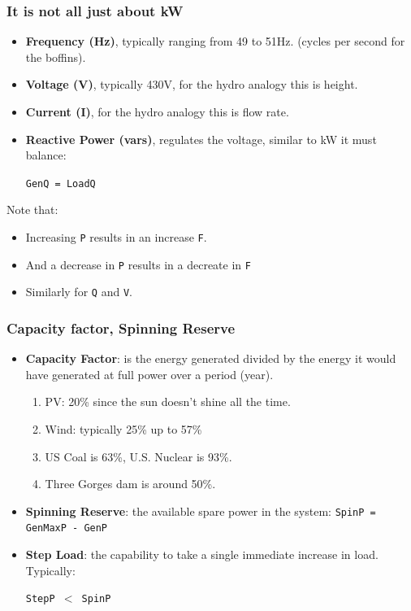 \documentclass{beamer}
\begin{document}
\begin{frame}\frametitle{It is not all just about kW}
  \begin{itemize}
  \item \textbf{Frequency (Hz)}, typically ranging from 49 to 51Hz.
    (cycles per second for the boffins).
  \item \textbf{Voltage (V)}, typically 430V, for the hydro analogy
    this is height.
  \item \textbf{Current (I)}, for the hydro analogy this is flow rate.
    \pause
  \item \textbf{Reactive Power (vars)}, regulates the voltage, similar
    to kW it must balance:
    
    \texttt{GenQ = LoadQ}
  \end{itemize}
  Note that:
  \begin{itemize}
  \item Increasing \texttt{P} results in an increase \texttt{F}.
  \item And a decrease in \texttt{P} results in a decreate in
    \texttt{F}
  \item Similarly for \texttt{Q} and \texttt{V}.
  \end{itemize}
\end{frame}

\begin{frame}\frametitle{Capacity factor, Spinning Reserve}
  \begin{itemize}
  \item \textbf{Capacity Factor}: is the energy generated divided by the
    energy it would have generated at full power over a period (year).
    \pause
    \begin{enumerate}
    \item PV: 20\% since the sun doesn't shine all the time.
    \item Wind: typically 25\% up to 57\% 
    \item US Coal is 63\%, U.S. Nuclear is 93\%.
    \item Three Gorges dam is around 50\%.
    \end{enumerate}
    \pause
  \item \textbf{Spinning Reserve}: the available spare power
    in the system: 
    \texttt{SpinP = GenMaxP - GenP}
    \pause
  \item \textbf{Step Load}: the capability to take a single
    immediate increase in load. Typically: 

    \texttt{StepP $<$ SpinP}
  \end{itemize}
\end{frame}
\end{document}
